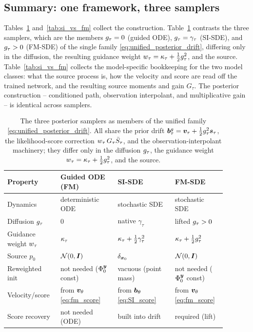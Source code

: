 \subsection{Summary: one framework, three samplers}
\label{subsec:summary_table}

Tables~\ref{tab:samplers} and~\ref{tab:si_vs_fm} collect the construction. Table~\ref{tab:samplers} contrasts the three samplers, which are the members $g_\tau=0$ (guided ODE), $g_\tau=\gamma_\tau$ (SI-SDE), and $g_\tau>0$ (FM-SDE) of the single family \eqref{eq:unified_posterior_drift}, differing only in the diffusion, the resulting guidance weight $w_\tau=\kappa_\tau+\tfrac12g_\tau^2$, and the source. Table~\ref{tab:si_vs_fm} collects the model-specific bookkeeping for the two model classes: what the source process is, how the velocity and score are read off the trained network, and the resulting source moments and gain $G_\tau$. The posterior construction -- conditioned path, observation interpolant, and multiplicative gain -- is identical across samplers.

\begin{table}[ht]
    \centering
    \caption{The three posterior samplers as members of the unified family \eqref{eq:unified_posterior_drift}. All share the prior drift $\bm{b}^{g}_\tau=\bm{v}_\tau+\tfrac12g_\tau^2\bm{s}_\tau$, the likelihood-score correction $w_\tau\,G_\tau\bar S_\tau$, and the observation-interpolant machinery; they differ only in the diffusion $g_\tau$, the guidance weight $w_\tau=\kappa_\tau+\tfrac12g_\tau^2$, and the source.}
    \label{tab:samplers}
    \small
    \begin{tabular}{p{0.2\linewidth}|p{0.24\linewidth}|p{0.24\linewidth}|p{0.21\linewidth}}
        \toprule
        \textbf{Property} & \textbf{Guided ODE (FM)} & \textbf{SI-SDE} & \textbf{FM-SDE} \\
        \midrule
        Dynamics & deterministic ODE & stochastic SDE & stochastic SDE \\
        Diffusion $g_\tau$ & $0$ & native $\gamma_\tau$ & lifted $g_\tau>0$ \\
        Guidance weight $w_\tau$ & $\kappa_\tau$ & $\kappa_\tau+\tfrac12\gamma_\tau^2$ & $\kappa_\tau+\tfrac12g_\tau^2$ \\
        Source $p_0$ & $\mathcal{N}(0,\bm{I})$ & $\delta_{\boldsymbol{x}_0}$ & $\mathcal{N}(0,\bm{I})$ \\
        Reweighted init & not needed ($\Phi_0^{\boldsymbol{y}}$ const) & vacuous (point mass) & not needed ($\Phi_0^{\boldsymbol{y}}$ const) \\
        Velocity/score & from $\bm{v}_\theta$ \eqref{eq:fm_score} & from $\bm{b}_\theta$ \eqref{eq:SI_score} & from $\bm{v}_\theta$ \eqref{eq:fm_score} \\
        Score recovery & not needed (ODE) & built into drift & required (lift) \\
        \bottomrule
    \end{tabular}
\end{table}

